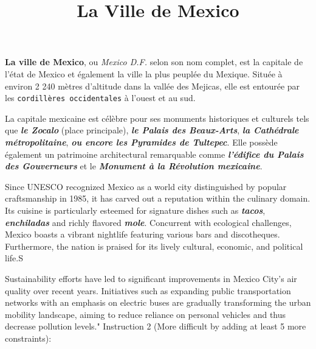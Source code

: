 \documentclass[12pt, a4paper]{article}
\title{La Ville de Mexico}
\author{}
\date{}
\begin{document}
   \maketitle

\textbf{La ville de Mexico}, ou \textit{Mexico D.F.} selon son nom complet, est la capitale de l'état de Mexico et également la ville la plus peuplée du Mexique. Située à environ 2 240 mètres d'altitude dans la vallée des Mejicas, elle est entourée par les \texttt{cordillères occidentales} à l'ouest et au sud.

La capitale mexicaine est célèbre pour ses monuments historiques et culturels tels que \textbf{\textit{le Zocalo}} (place principale), \textbf{\textit{le Palais des Beaux-Arts}}, \textbf{\textit{la Cathédrale métropolitaine}}, \textbf{\textit{ou encore les Pyramides de Tultepec}}. Elle possède également un patrimoine architectural remarquable comme \textbf{\textit{l'édifice du Palais des Gouverneurs}} et le \textbf{\textit{Monument à la Révolution mexicaine}}.

Since UNESCO recognized Mexico as a world city distinguished by popular craftsmanship in 1985, it has carved out a reputation within the culinary domain. Its cuisine is particularly esteemed for signature dishes such as \textbf{\textit{tacos}}, \textbf{\textit{enchiladas}} and richly flavored \textbf{\textit{mole}}.
Concurrent with ecological challenges, Mexico boasts a vibrant nightlife featuring various bars and discotheques. Furthermore, the nation is praised for its lively cultural, economic, and political life.S

Sustainability efforts have led to significant improvements in Mexico City's air quality over recent years. Initiatives such as expanding public transportation networks with an emphasis on electric buses are gradually transforming the urban mobility landscape, aiming to reduce reliance on personal vehicles and thus decrease pollution levels." Instruction 2 (More difficult by adding at least {5} more constraints):
\end{document}
